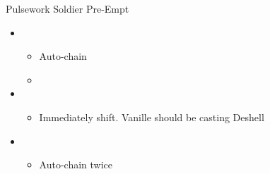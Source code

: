 \begin{battle}{Pulsework Soldier Pre-Empt}
\begin{itemize}
    \item \first
    \begin{itemize}
        \item Auto-chain
        \item \stagger
    \end{itemize}
    \item \fourth
    \begin{itemize}
        \item Immediately shift. Vanille should be casting Deshell
    \end{itemize}
    \item \first
    \begin{itemize}
        \item Auto-chain twice
    \end{itemize}
\end{itemize}
\end{battle}


